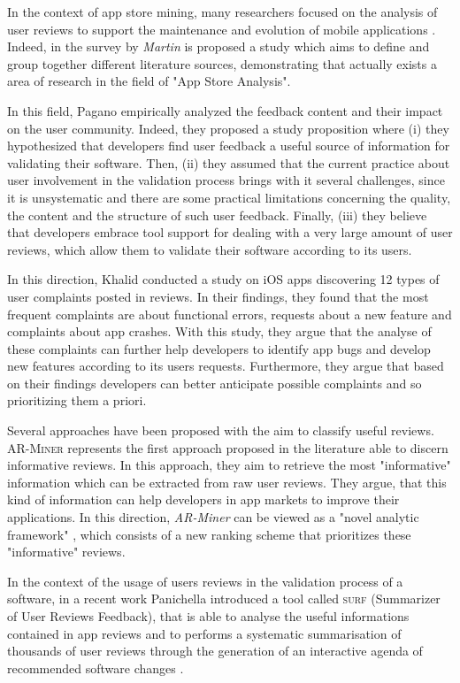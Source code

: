 In the context of app store mining, many researchers focused on the analysis of user reviews to support the maintenance and evolution of mobile applications \cite{Martin:tse2017}.
Indeed, in the survey by \textit{Martin} \etal \cite{Martin:tse2017} is proposed a study which aims to define and group together different literature sources, demonstrating that actually exists a area of research in the field of "App Store Analysis".

In this field, Pagano \etal \cite{pagano} empirically analyzed the feedback content and their impact on the user community. 
Indeed, they proposed a study proposition where (i) they hypothesized that developers find user feedback a useful source of information for validating their software. Then, (ii) they assumed that the current practice about user involvement in the validation process brings with it several challenges, since it is unsystematic and there are some practical limitations concerning the quality, the content and the structure of such user feedback. 
Finally, (iii) they believe that developers embrace tool support for dealing with a very large amount of user reviews, which allow them to validate their software according to its users. 

In this direction, Khalid \etal \cite{Khalid:2015:IEEE} conducted a study on iOS apps discovering 12 types of user complaints posted in reviews. 
In their findings, they found that the most frequent complaints are about functional errors, requests about a new feature and complaints about app crashes. With this study, they argue that the analyse of these complaints can further help developers to identify app bugs and develop new features according to its users requests. 
Furthermore, they argue that based on their findings developers can better anticipate possible complaints and so prioritizing them a priori.   

Several approaches have been proposed with the aim to classify useful reviews.
\textsc{AR-Miner} \cite{Chen} represents the first approach proposed in the literature able to discern informative reviews. 
In this approach, they aim to retrieve the most "informative" information which can be extracted from raw user reviews. They argue, that this kind of information can help developers in app markets to improve their applications. In this direction, \textit{AR-Miner} can be viewed as a "novel analytic framework" \cite{Chen}, which consists of a new ranking scheme that prioritizes these "informative" reviews. 

In the context of the usage of users reviews in the validation process of a software, in a recent work Panichella \etal introduced a tool called \textsc{surf} (Summarizer of User Reviews Feedback), that is able to analyse the useful informations contained in app reviews and to performs a systematic summarisation of thousands of user reviews through the generation of an interactive agenda of recommended software changes 
\cite{sorbo}. 

